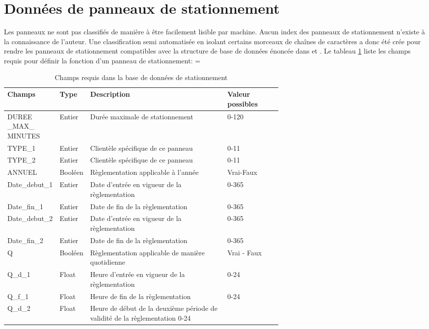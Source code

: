 \section{Données de panneaux de stationnement}
  Les panneaux ne sont pas classifiés de manière à être facilement lisible par machine. Aucun index des panneaux de stationnement n'existe à la connaissance de l'auteur. Une classification semi automatisée en isolant certains morceaux de chaînes de caractères a donc été crée pour rendre les panneaux de stationnement compatibles avec la structure de base de données énoncée dans \textcite{Bourdeau:MethodologieAnalyse:2014} et \textcite{Morency:DeveloppementMise:2022}. Le tableau \ref{tab:donnees_requises} liste les champs requis pour définir la fonction d'un panneau de stationnement:
  \LTcapwidth=\textwidth

  \begin{longtable}{p{0.15 \linewidth}  l p{0.5\linewidth} l  }
    \hline
    Champs & Type & Description & Valeur possibles \\
    \hline
    \endhead
    \hline
    \endfoot
    \hline
    \caption{Champs requis dans la base de données de stationnement}
    \label{tab:donnees_requises}
    \endlastfoot
    DUREE \_MAX\_ MINUTES & Entier & Durée maximale de stationnement & 0-120 \\
    TYPE\_1 & Entier & Clientèle spécifique de ce panneau & 0-11\\
    TYPE\_2 & Entier & Clientèle spécifique de ce panneau & 0-11\\
    ANNUEL & Booléen & Règlementation applicable à l'année & Vrai-Faux \\
    Date\_debut\_1 & Entier &  Date d'entrée en vigueur de la règlementation & 0-365\\
    Date\_fin\_1 & Entier & Date de fin de la règlementation & 0-365 \\
    Date\_debut\_2 & Entier & Date d'entrée en vigueur de la règlementation & 0-365 \\
    Date\_fin\_2 & Entier & Date de fin de la règlementation & 0-365 \\
    Q & Booléen & Règlementation applicable de manière quotidienne & Vrai - Faux \\
    Q\_d\_1 & Float & Heure d'entrée en vigueur de la règlementation & 0-24 \\
    Q\_f\_1 & Float & Heure de fin de la règlementation & 0-24\\
    Q\_d\_2 & Float & Heure de début de la deuxième période de validité de la règlementation 0-24\\

\end{longtable}
